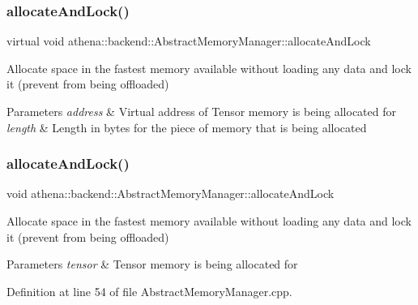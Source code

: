 \subsubsection{\texorpdfstring{allocate\+And\+Lock()}{allocateAndLock()}\hspace{0.1cm}{\footnotesize\ttfamily [3/4]}}
{\footnotesize\ttfamily virtual void athena\+::backend\+::\+Abstract\+Memory\+Manager\+::allocate\+And\+Lock}

Allocate space in the fastest memory available without loading any data and lock it (prevent from being offloaded) 
\begin{DoxyParams}{Parameters}
{\em address} & Virtual address of Tensor memory is being allocated for \\
\hline
{\em length} & Length in bytes for the piece of memory that is being allocated \\
\hline
\end{DoxyParams}
\mbox{\label{classathena_1_1backend_1_1generic_1_1_generic_memory_manager_ad40a653a8b32410956ba835ca1bb3e5f}} 
\subsubsection{\texorpdfstring{allocate\+And\+Lock()}{allocateAndLock()}\hspace{0.1cm}{\footnotesize\ttfamily [4/4]}}
{\footnotesize\ttfamily void athena\+::backend\+::\+Abstract\+Memory\+Manager\+::allocate\+And\+Lock}

Allocate space in the fastest memory available without loading any data and lock it (prevent from being offloaded) 
\begin{DoxyParams}{Parameters}
{\em tensor} & Tensor memory is being allocated for \\
\hline
\end{DoxyParams}


Definition at line 54 of file Abstract\+Memory\+Manager.\+cpp.

\mbox{\label{classathena_1_1backend_1_1generic_1_1_generic_memory_manager_ab90a8874618b851d5309cef66e79d08a}} 
